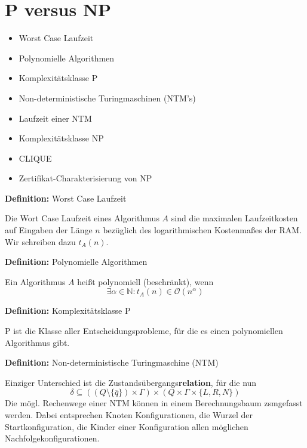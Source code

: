 \documentclass[a4paper,graphics,11pt]{article}
\begin{document}
\newpage



\section{P versus NP}

\begin{itemize}
    \item Worst Case Laufzeit
    \item Polynomielle Algorithmen
    \item Komplexitätsklasse \textsf{P}
    \item Non-deterministische Turingmaschinen (NTM's)
    \item Laufzeit einer NTM
    \item Komplexitätsklasse \textsf{NP}
    \item CLIQUE
    \item Zertifikat-Charakterisierung von \textsf{NP}
\end{itemize}

\textbf{Definition:} Worst Case Laufzeit

Die Wort Case Laufzeit eines Algorithmus $A$ sind die maximalen Laufzeitkosten
auf Eingaben der Länge $n$ bezüglich des logarithmischen Kostenmaßes der RAM.
Wir schreiben dazu $t_A(n)$.

\strut

\textbf{Definition:} Polynomielle Algorithmen

Ein Algorithmus $A$ heißt polynomiell (beschränkt), wenn
$$
    \exists \alpha \in \mathbb{N}: t_A(n) \in \mathcal{O}(n^\alpha)
$$

\strut

\textbf{Definition:} Komplexitätsklasse \textsf{P}

\textsf{P} ist die Klasse aller Entscheidungsprobleme, für die es einen polynomiellen
Algorithmus gibt.

\strut

\textbf{Definition:} Non-deterministische Turingmaschine (NTM)

Einziger Unterschied ist die Zustandsübergangs\textbf{relation}, für die nun
$$
    \delta \subseteq ((Q\setminus \{\overline{q}\}) \times \Gamma) \times (Q \times \Gamma \times \{L,R,N\})
$$
Die mögl. Rechenwege einer NTM können in einem Berechnungsbaum zsmgefasst werden.
Dabei entsprechen Knoten Konfigurationen, die Wurzel der Startkonfiguration,
die Kinder einer Konfiguration allen möglichen Nachfolgekonfigurationen.
\end{document}
